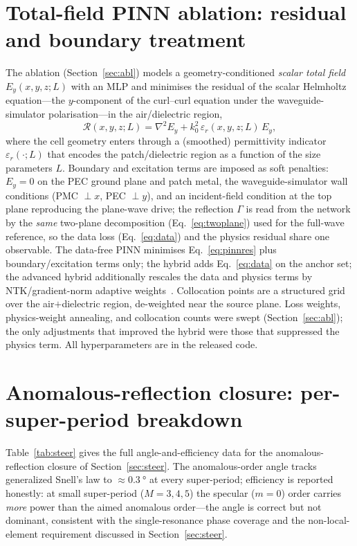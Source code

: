 \documentclass[11pt]{article}
\begin{document}
\section{Total-field PINN ablation: residual and boundary treatment}\label{app:pinn}
The ablation (Section~\ref{sec:abl}) models a geometry-conditioned \emph{scalar total field}
$E_y(x,y,z;L)$ with an MLP and minimises the residual of the scalar Helmholtz equation---the $y$-component
of the curl--curl equation under the waveguide-simulator polarisation---in the air/dielectric region,
\begin{equation}
\mathcal{R}(x,y,z;L)=\nabla^2 E_y + k_0^2\,\varepsilon_r(x,y,z;L)\,E_y ,
\label{eq:pinnres}
\end{equation}
where the cell geometry enters through a (smoothed) permittivity indicator $\varepsilon_r(\cdot;L)$ that
encodes the patch/dielectric region as a function of the size parameters $L$. Boundary and excitation terms
are imposed as soft penalties: $E_y=0$ on the PEC ground plane and patch metal, the waveguide-simulator wall
conditions (PMC $\perp x$, PEC $\perp y$), and an incident-field condition at the top plane reproducing the
plane-wave drive; the reflection $\Gamma$ is read from the network by the \emph{same} two-plane
decomposition (Eq.~\eqref{eq:twoplane}) used for the full-wave reference, so the data loss
(Eq.~\eqref{eq:data}) and the physics residual share one observable. The data-free PINN minimises
Eq.~\eqref{eq:pinnres} plus boundary/excitation terms only; the hybrid adds Eq.~\eqref{eq:data} on the
anchor set; the advanced hybrid additionally rescales the data and physics terms by NTK/gradient-norm
adaptive weights~\cite{wanggrad2021}. Collocation points are a structured grid over the air$+$dielectric
region, de-weighted near the source plane. Loss weights, physics-weight annealing, and collocation counts
were swept (Section~\ref{sec:abl}); the only adjustments that improved the hybrid were those that suppressed
the physics term. All hyperparameters are in the released code.

\section{Anomalous-reflection closure: per-super-period breakdown}\label{app:steer}
Table~\ref{tab:steer} gives the full angle-and-efficiency data for the anomalous-reflection closure of
Section~\ref{sec:steer}. The anomalous-order angle tracks generalized Snell's law to
$\approx\!\SI{0.3}{\degree}$ at every super-period; efficiency is reported honestly: at small super-period
($M{=}3,4,5$) the specular ($m{=}0$) order carries \emph{more} power than the aimed anomalous order---the
angle is correct but not dominant, consistent with the single-resonance phase coverage and the
non-local-element requirement discussed in Section~\ref{sec:steer}.
\end{document}
